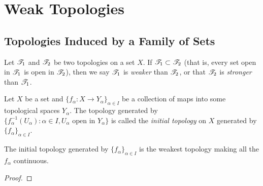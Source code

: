 \section{Weak Topologies}

\subsection{Topologies Induced by a Family of Sets}

\begin{definition}
	Let $\mathscr{T}_1$ and $\mathscr{T}_2$ be two topologies on a set $X$. If $\mathscr{T}_1 \subset \mathscr{T}_2$ (that is, every set open in $\mathscr{T}_1$ is open in $\mathscr{T}_2$), then we say $\mathscr{T}_1$ is \emph{weaker} than $\mathscr{T}_2$, or that $\mathscr{T}_2$ is \emph{stronger} than $\mathscr{T}_1$.
\end{definition}

\begin{definition}
	Let $X$ be a set and $\{f_\alpha:X \rightarrow Y_\alpha\}_{\alpha \in I}$ be a collection of maps into some topological spaces $Y_\alpha$. The topology generated by $\{f_\alpha^{-1}(U_\alpha) : \alpha \in I, U_\alpha \text{ open in }Y_\alpha\}$ is called the \emph{initial topology} on $X$ generated by $\{f_\alpha\}_{\alpha \in I}$.
\end{definition}

\begin{proposition}
	The initial topology generated by $\{f_\alpha\}_{\alpha \in I}$ is the weakest topology making all the $f_\alpha$ continuous.
\end{proposition}
	{\color{red}
	\begin{proof}
			
	\end{proof}}

